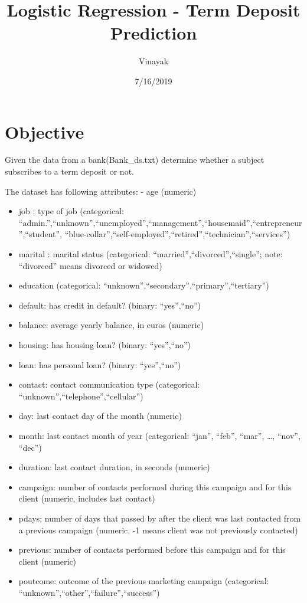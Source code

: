 \documentclass[]{article}
\title{Logistic Regression - Term Deposit Prediction}
\author{Vinayak}
\date{7/16/2019}
\begin{document}
\maketitle

{
\setcounter{tocdepth}{3}
\tableofcontents
}
\hypertarget{objective}{%
\section{Objective}\label{objective}}

Given the data from a bank(Bank\_ds.txt) determine whether a subject
subscribes to a term deposit or not.

The dataset has following attributes: - age (numeric)

\begin{itemize}
\item
  job : type of job (categorical:
  ``admin.'',``unknown'',``unemployed'',``management'',``housemaid'',``entrepreneur'',``student'',
  ``blue-collar'',``self-employed'',``retired'',``technician'',``services'')
\item
  marital : marital status (categorical:
  ``married'',``divorced'',``single''; note: ``divorced'' means divorced
  or widowed)
\item
  education (categorical:
  ``unknown'',``secondary'',``primary'',``tertiary'')
\item
  default: has credit in default? (binary: ``yes'',``no'')
\item
  balance: average yearly balance, in euros (numeric)
\item
  housing: has housing loan? (binary: ``yes'',``no'')
\item
  loan: has personal loan? (binary: ``yes'',``no'')
\item
  contact: contact communication type (categorical:
  ``unknown'',``telephone'',``cellular'')
\item
  day: last contact day of the month (numeric)
\item
  month: last contact month of year (categorical: ``jan'', ``feb'',
  ``mar'', \ldots{}, ``nov'', ``dec'')
\item
  duration: last contact duration, in seconds (numeric)
\item
  campaign: number of contacts performed during this campaign and for
  this client (numeric, includes last contact)
\item
  pdays: number of days that passed by after the client was last
  contacted from a previous campaign (numeric, -1 means client was not
  previously contacted)
\item
  previous: number of contacts performed before this campaign and for
  this client (numeric)
\item
  poutcome: outcome of the previous marketing campaign (categorical:
  ``unknown'',``other'',``failure'',``success'')
\end{itemize}
\end{document}
